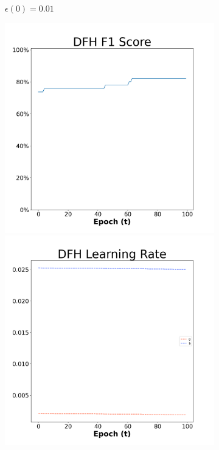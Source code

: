 \begin{figure}[H]
\begin{subfigure}{0.3\textwidth}
  \caption{$\epsilon(0)=0.01$}
\end{subfigure}\hfil %
\begin{subfigure}{0.3\textwidth}
  \includegraphics[width=\linewidth]{images/exper2/Ionosphere/DFH_0.03_f1.png}
  \includegraphics[width=\linewidth]{images/exper2/Ionosphere/DFH_0.03_lr.png}

\end{subfigure}
\end{figure}
